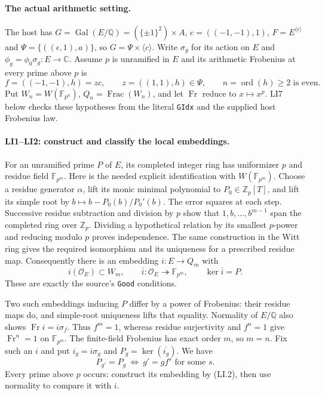 \documentclass[11pt,a4paper]{article}
\numberwithin{equation}{section}
\theoremstyle{remark}\newtheorem{remark}[theorem]{Remark}
\begin{document}
\paragraph{The actual arithmetic setting.}
The host has
$G=\operatorname{Gal}(E/\mathbb Q)=(\{\pm1\}^2)\times A$,
$c=((-1,-1),1)$, $F=E^{\langle c\rangle}$ and
$\Psi=\{((\epsilon,1),a)\}$, so $G=\Psi\times\langle c\rangle$.
Write $\sigma_g$ for its action on $E$ and
$\phi_g=\phi_0\sigma_g:E\to\mathbb C$.
Assume $p$ is unramified in $E$ and its arithmetic Frobenius at every
prime above $p$ is
\[
 f=((-1,-1),h)=zc,\qquad z=((1,1),h)\in\Psi,
 \qquad n=\operatorname{ord}(h)\ge2\text{ is even}.       \tag{LI.1}
\]
Put $W_n=W(\mathbb F_{p^n})$, $Q_n=\operatorname{Frac}(W_n)$,
and let $\operatorname{Fr}$ reduce to $x\mapsto x^p$.
LI7 below checks these hypotheses from the literal \texttt{GIdx}
and the supplied host Frobenius law.

\paragraph{LI1--LI2: construct and classify the local embeddings.}
For an unramified prime $P$ of $E$, its completed integer ring has
uniformizer $p$ and residue field $\mathbb F_{p^m}$. Here is the needed
explicit identification with $W(\mathbb F_{p^m})$.
Choose a residue generator $\alpha$, lift its monic minimal polynomial
to $P_0\in\mathbb Z_p[T]$, and lift its simple root by
$b\mapsto b-P_0(b)/P_0'(b)$. The error squares at each step.
Successive residue subtraction and division by $p$ show that
$1,b,\ldots,b^{m-1}$ span the completed ring over $\mathbb Z_p$.
Dividing a hypothetical relation by its smallest $p$-power and reducing
modulo $p$ proves independence. The same construction in the Witt ring
gives the required isomorphism and its uniqueness for a prescribed
residue map. Consequently there is an embedding $i:E\to Q_m$ with
\[
 i(\mathcal O_E)\subset W_m,\qquad
 \overline i:\mathcal O_E\twoheadrightarrow\mathbb F_{p^m},
 \qquad\ker\overline i=P.                               \tag{LI.2}
\]
These are exactly the source's \texttt{Good} conditions.

Two such embeddings inducing $P$ differ by a power of Frobenius:
their residue maps do, and simple-root uniqueness lifts that equality.
Normality of $E/\mathbb Q$ also shows
$\operatorname{Fr}i=i\sigma_f$. Thus $f^m=1$, whereas residue
surjectivity and $f^n=1$ give $\operatorname{Fr}^n=1$ on
$\mathbb F_{p^m}$. The finite-field Frobenius has exact order $m$,
so $m=n$. Fix such an $i$ and put $i_g=i\sigma_g$ and
$P_g=\ker(\overline{i_g})$. We have
\[
 P_{g'}=P_g\ \Longleftrightarrow\ g'=gf^s\text{ for some }s.
                                                               \tag{LI.3}
\]
Every prime above $p$ occurs: construct its embedding by (LI.2),
then use normality to compare it with $i$.
\end{document}
